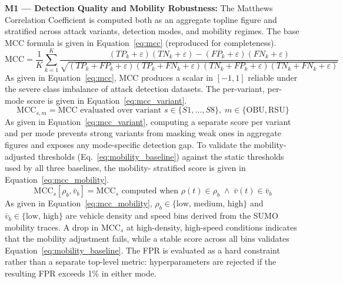 \documentclass[12pt, a4paper]{report}
\begin{document}
{{%

\textbf{M1 — Detection Quality and Mobility Robustness:}
The Matthews Correlation Coefficient is computed both
as an aggregate topline figure and stratified across
attack variants, detection modes, and mobility regimes.
The base \ac{MCC} formula is given in
Equation~\eqref{eq:mcc} (reproduced for completeness).
\begin{equation}
\text{MCC} =
\frac{1}{K}\sum_{k=1}^{K}
\frac{(TP_k+\varepsilon)(TN_k+\varepsilon) - (FP_k+\varepsilon)(FN_k+\varepsilon)}
{\sqrt{(TP_k{+}FP_k{+}\varepsilon)(TP_k{+}FN_k{+}\varepsilon)(TN_k{+}FP_k{+}\varepsilon)(TN_k{+}FN_k{+}\varepsilon)}}
\label{eq:mcc}
\end{equation}
As given in Equation~\eqref{eq:mcc}, MCC produces a
scalar in $[-1,1]$ reliable under the severe class
imbalance of attack detection datasets.
The per-variant, per-mode score is given in
Equation~\eqref{eq:mcc_variant}.
\begin{equation}
\text{MCC}_{s,m} = \text{MCC evaluated over variant }
s \in \{S1,\ldots,S8\},\;
m \in \{\text{OBU},\text{RSU}\}
\label{eq:mcc_variant}
\end{equation}
As given in Equation~\eqref{eq:mcc_variant}, computing
a separate score per variant and per mode prevents
strong variants from masking weak ones in aggregate
figures and exposes any mode-specific detection gap.
To validate the mobility-adjusted thresholds
(Eq.~\ref{eq:mobility_baseline}) against the static
thresholds used by all three baselines, the mobility-
stratified score is given in
Equation~\eqref{eq:mcc_mobility}.
\begin{equation}
\text{MCC}_{s}[\rho_b, \bar{v}_b] =
\text{MCC}_{s}\text{ computed when }
\rho(t) \in \rho_b \;\land\;
\bar{v}(t) \in \bar{v}_b
\label{eq:mcc_mobility}
\end{equation}
As given in Equation~\eqref{eq:mcc_mobility},
$\rho_b \in \{\text{low, medium, high}\}$ and
$\bar{v}_b \in \{\text{low, high}\}$ are vehicle
density and speed bins derived from the SUMO mobility
traces. A drop in $\text{MCC}_{s}$ at high-density,
high-speed conditions indicates that the mobility
adjustment fails, while a stable score across all bins
validates Equation~\eqref{eq:mobility_baseline}.
The \ac{FPR} is evaluated as a hard constraint rather
than a separate top-level metric: hyperparameters are
rejected if the resulting FPR exceeds 1\% in either mode.


}}
\end{document}

